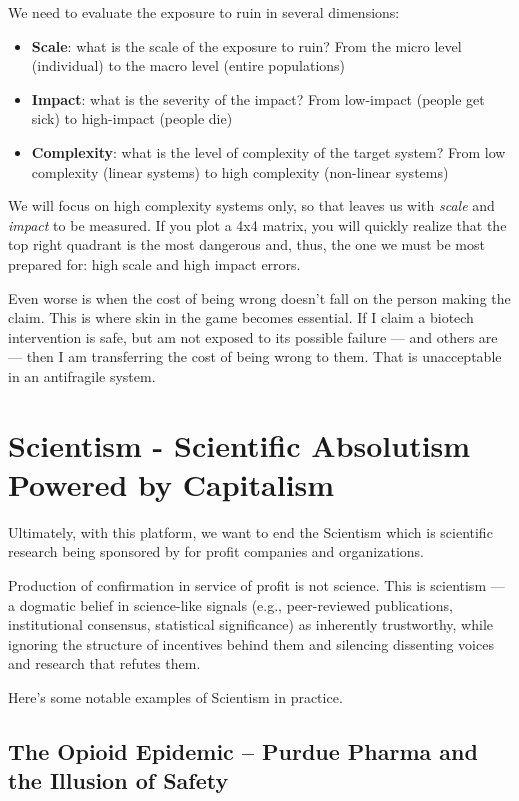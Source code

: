 \documentclass{article}
\begin{document}
We need to evaluate the exposure to ruin in several dimensions:

\begin{itemize}
	\item \textbf{Scale}: what is the scale of the exposure to ruin? From the micro level (individual) to the macro level (entire populations)
	\item \textbf{Impact}: what is the severity of the impact? From low-impact (people get sick) to high-impact (people die)
	\item \textbf{Complexity}: what is the level of complexity of the target system? From low complexity (linear systems) to high complexity (non-linear systems)
\end{itemize}

We will focus on high complexity systems only, so that leaves us with \textit{scale} and \textit{impact} to be measured.
If you plot a 4x4 matrix, you will quickly realize that the top right quadrant is the most dangerous and, thus, the one we must be most prepared for: high scale and high impact errors.

Even worse is when the cost of being wrong doesn't fall on the person making the claim. This is where skin in the game becomes essential. If I claim a biotech intervention is safe, but am not exposed to its possible failure — and others are — then I am transferring the cost of being wrong to them. That is unacceptable in an antifragile system.

\section{Scientism - Scientific Absolutism Powered by Capitalism}
Ultimately, with this platform, we want to end the Scientism which is scientific research being sponsored by for profit companies and organizations.

Production of confirmation in service of profit is not science. This is scientism — a dogmatic belief in science-like signals (e.g., peer-reviewed publications, institutional consensus, statistical significance) as inherently trustworthy, while ignoring the structure of incentives behind them and silencing dissenting voices and research that refutes them.

Here's some notable examples of Scientism in practice.

\subsection{The Opioid Epidemic – Purdue Pharma and the Illusion of Safety}
\end{document}
